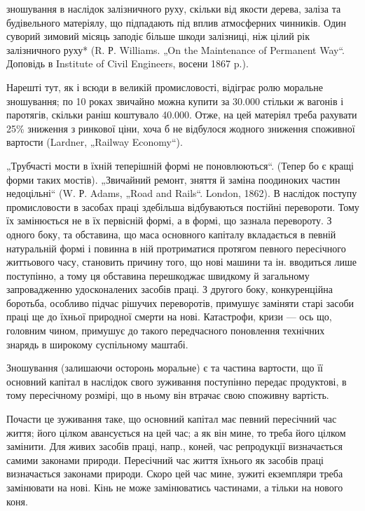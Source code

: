 \parcont{}  %
зношування в наслідок залізничного руху, скільки від якости дерева, заліза та будівельного
матеріялу, що підпадають під вплив атмосферних чинників. Один суворий зимовий місяць заподіє більше
шкоди залізниці, ніж цілий рік залізничного руху* (R. Р. Williams. „On the Maintenance of Permanent
Way“. Доповідь в Institute of Civil Engineers, восени 1867 p.).

Нарешті тут, як і всюди в великій промисловості, відіграє ролю моральне зношування; по 10 роках
звичайно можна купити за 30.000 стільки ж вагонів і паротягів, скільки раніш коштувало 40.000. Отже, на цей матеріял треба рахувати 25\% зниження з ринкової ціни, хоча б не відбулося
жодного зниження споживної вартости (Lardner,
„Railway Economy“).

„Трубчасті мости в їхній теперішній формі не поновлюються“. (Тепер бо є кращі форми таких мостів).
„Звичайний ремонт, зняття й заміна поодиноких частин недоцільні“ (W. Р. Adams, „Road and Rails“.
London, 1862). В наслідок поступу промисловости в засобах праці здебільша відбуваються постійні
перевороти. Тому їх замінюється не в їх первісній формі, а в формі, що зазнала перевороту. З одного
боку, та обставина,
що маса основного капіталу вкладається в певній натуральній формі і повинна в ній протриматися
протягом певного пересічного життьового часу, становить причину того, що нові машини та ін.
вводиться лише поступінно, а тому ця обставина перешкоджає швидкому й загальному запровадженню
удосконалених засобів праці. З другого боку, конкуренційна боротьба, особливо підчас рішучих
переворотів, примушує заміняти
старі засоби праці ще до їхньої природної смерти на нові. Катастрофи, кризи — ось що, головним
чином, примушує до такого передчасного поновлення технічних знарядь в широкому суспільному маштабі.

Зношування (залишаючи осторонь моральне) є та частина вартости, що її основний капітал в наслідок
свого зуживання поступінно передає продуктові, в тому пересічному розмірі, що в ньому він втрачає
свою споживну вартість.

Почасти це зуживання таке, що основний капітал має певний пересічний час життя; його цілком
авансується на цей час; а як він мине, то треба його цілком замінити. Для живих засобів праці,
напр., коней, час репродукції визначається самими законами природи. Пересічний час життя їхнього як
засобів праці визначається законами природи. Скоро цей час мине, зужиті екземпляри треба замінювати
на нові. Кінь не може замінюватись частинами, а тільки на нового коня.

